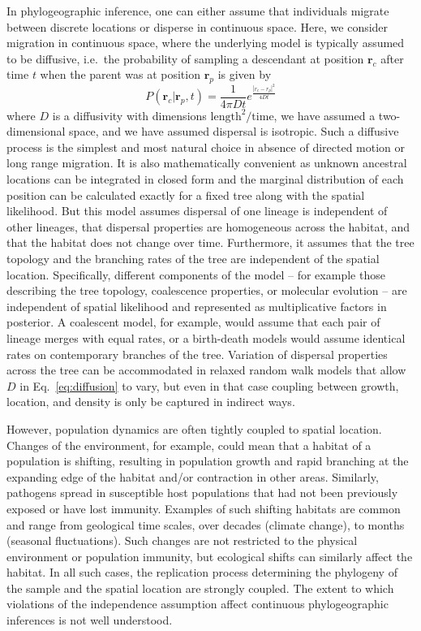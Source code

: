 \documentclass[aps,rmp, twocolumn]{revtex4}
\newcommand{\rvec}{\mathbf{r}}
\begin{document}
In phylogeographic inference, one can either assume that individuals migrate between discrete locations or disperse in continuous space.
Here, we consider migration in continuous space, where the underlying model is typically assumed to be diffusive, i.e.~the probability of sampling a descendant at position $\rvec_c$ after time $t$ when the parent was at position $\rvec_p$ is given by
\begin{equation}
    P(\rvec_c| \rvec_p, t) = \frac{1}{4\pi D t}e^{\frac{|r_c - r_p|^2}{4Dt}}
    \label{eq:diffusion}
\end{equation}
where $D$ is a diffusivity with dimensions $\mathrm{length}^2/\mathrm{time}$, we have assumed a two-dimensional space, and we have assumed dispersal is isotropic.
Such a diffusive process is the simplest and most natural choice in absence of directed motion or long range migration.
It is also mathematically convenient as unknown ancestral locations can be integrated in closed form and the marginal distribution of each position can be calculated exactly for a fixed tree along with the spatial likelihood.
But this model assumes dispersal of one lineage is independent of other lineages, that dispersal properties are homogeneous across the habitat, and that the habitat does not change over time.
Furthermore, it assumes that the tree topology and the branching rates of the tree are independent of the spatial location.
Specifically, different components of the model -- for example those describing the tree topology, coalescence properties, or molecular evolution -- are independent of spatial likelihood and represented as multiplicative factors in posterior.
A coalescent model, for example, would assume that each pair of lineage merges with equal rates, or a birth-death models would assume identical rates on contemporary branches of the tree.
Variation of dispersal properties across the tree can be accommodated in relaxed random walk models that allow $D$ in Eq.~\ref{eq:diffusion} to vary, but even in that case coupling between growth, location, and density is only be captured in indirect ways.

However, population dynamics are often tightly coupled to spatial location.
Changes of the environment, for example, could mean that a habitat of a population is shifting, resulting in population growth and rapid branching at the expanding edge of the habitat and/or contraction in other areas.
Similarly, pathogens spread in susceptible host populations that had not been previously exposed or have lost immunity.
Examples of such shifting habitats are common and range from geological time scales, over decades (climate change), to months (seasonal fluctuations).
Such changes are not restricted to the physical environment or population immunity, but ecological shifts can similarly affect the habitat.
In all such cases, the replication process determining the phylogeny of the sample and the spatial location are strongly coupled.
The extent to which violations of the independence assumption affect continuous phylogeographic inferences is not well understood.
\end{document}
